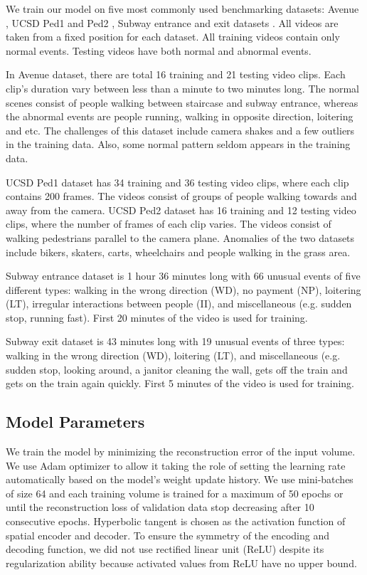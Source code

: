 \documentclass[a4paper]{article}
\begin{document}
We train our model on five most commonly used benchmarking datasets: Avenue \cite{lu2013}, UCSD Ped1 and Ped2 \cite{mahadevan2010}, Subway entrance and exit datasets \cite{adam2008}. All videos are taken from a fixed position for each dataset. All training videos contain only normal events. Testing videos have both normal and abnormal events. 

In Avenue dataset, there are total 16 training and 21 testing video clips. Each clip’s duration vary between less than a minute to two minutes long. The normal scenes consist of people walking between staircase and subway entrance, whereas the abnormal events are people running, walking in opposite direction, loitering and etc. The challenges of this dataset include camera shakes and a few outliers in the training data. Also, some normal pattern seldom appears in the training data.

UCSD Ped1 dataset has 34 training and 36 testing video clips, where each clip contains 200 frames. The videos consist of groups of people walking towards and away from the camera. UCSD Ped2 dataset has 16 training and 12 testing video clips, where the number of frames of each clip varies. The videos consist of walking pedestrians parallel to the camera plane. Anomalies of the two datasets include bikers, skaters, carts, wheelchairs and people walking in the grass area. 

Subway entrance dataset is 1 hour 36 minutes long with 66 unusual events of five different types: walking in the wrong direction (WD), no payment (NP), loitering (LT), irregular interactions between people (II), and miscellaneous (e.g. sudden stop, running fast). First 20 minutes of the video is used for training.

Subway exit dataset is 43 minutes long with 19 unusual events of three types: walking in the wrong direction (WD), loitering (LT), and miscellaneous (e.g. sudden stop, looking around, a janitor cleaning the wall, gets off the train and gets on the train again quickly. First 5 minutes of the video is used for training.

\subsection{Model Parameters}

We train the model by minimizing the reconstruction error of the input volume. We use Adam optimizer to allow it taking the role of setting the learning rate automatically based on the model’s weight update history. We use mini-batches of size 64 and each training volume is trained for a maximum of 50 epochs or until the reconstruction loss of validation data stop decreasing after 10 consecutive epochs. Hyperbolic tangent is chosen as the activation function of spatial encoder and decoder. To ensure the symmetry of the encoding and decoding function, we did not use rectified linear unit (ReLU) despite its regularization ability because activated values from ReLU have no upper bound. 
\end{document}
